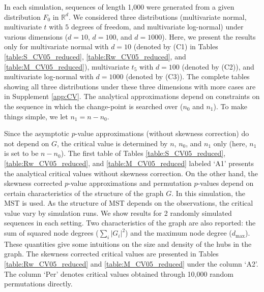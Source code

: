 \documentclass[arxiv, preprint]{imsart}
\numberwithin{equation}{section}
\theoremstyle{plain}
\begin{document}
In each simulation, sequences of length 1,000 were generated from a given distribution $F_0$ in $\mathbb{R}^d$. We considered three distributions (multivariate normal, multivariate $t$ with $5$ degrees of freedom, and multivariate log-normal) under various dimensions ($d=10$, $d=100$, and $d=1000$). Here, we present the results only for multivariate normal with $d=10$ (denoted by (C1) in Tables \ref{table:S_CV05_reduced}, \ref{table:Rw_CV05_reduced}, and \ref{table:M_CV05_reduced}), multivariate $t_5$ with $d=100$ (denoted by (C2)), and multivariate log-normal with $d=1000$ (denoted by (C3)). The complete tables showing all three distributions under these three dimensions with more cases are in Supplement  \ref{app:CV}. The analytical approximations depend on constraints on the sequence in which the change-point is searched over ($n_0$ and $n_1$). To make things simple, we let $n_1 = n - n_0$. 

Since the asymptotic $p$-value approximations (without skewness correction) do not depend on $G$, the critical value  is determined by $n$, $n_0$, and $n_1$ only (here, $n_1$ is set to be $n-n_0$). %
The first table of Tables \ref{table:S_CV05_reduced}, \ref{table:Rw_CV05_reduced}, and \ref{table:M_CV05_reduced} labeled `A1' presents the analytical critical values without skewness correction. 
On the other hand, the skewness corrected $p$-value approximations and permutation $p$-values depend on certain characteristics of the structure of the graph $G$.  In this simulation, the MST is used. As the structure of MST depends on the observations, the critical value vary by simulation runs. We show results for 2 randomly simulated sequences in each setting. Two characteristics of the graph are also reported: the sum of squared node degrees ($\sum_i|G_i|^2$) and the maximum node degree ($d_{\max}$). These quantities give some intuitions on the size and density of the hubs in the graph. The skewness corrected critical values are presented in Tables \ref{table:Rw_CV05_reduced} and \ref{table:M_CV05_reduced} under the column `A2'. The column `Per' denotes critical values obtained through 10,000 random permutations directly. 
\end{document}
